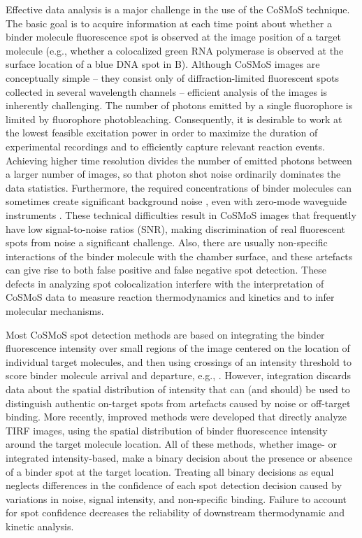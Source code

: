 Effective data analysis is a major challenge in the use of the CoSMoS technique. The basic goal is to acquire information at each time point about whether a binder molecule fluorescence spot is observed at the image position of a target molecule (e.g., whether a colocalized green RNA polymerase is observed at the surface location of a blue DNA spot in B). Although CoSMoS images are conceptually simple -- they consist only of diffraction-limited fluorescent spots collected in several wavelength channels -- efficient analysis of the images is inherently challenging. The number of photons emitted by a single fluorophore is limited by fluorophore photobleaching. Consequently, it is desirable to work at the lowest feasible excitation power in order to maximize the duration of experimental recordings and to efficiently capture relevant reaction events. Achieving higher time resolution divides the number of emitted photons between a larger number of images, so that photon shot noise ordinarily dominates the data statistics. Furthermore, the required concentrations of binder molecules can sometimes create significant background noise \citep{Peng2018-ge, Van_Oijen2011-ig}, even with zero-mode waveguide instruments \citep{Chen2014-jd}. These technical difficulties result in CoSMoS images that frequently have low signal-to-noise ratios (SNR), making discrimination of real fluorescent spots from noise a significant challenge. Also, there are usually non-specific interactions of the binder molecule with the chamber surface, and these artefacts can give rise to both false positive and false negative spot detection. These defects in analyzing spot colocalization interfere with the interpretation of CoSMoS data to measure reaction thermodynamics and kinetics and to infer molecular mechanisms.

Most CoSMoS spot detection methods are based on integrating the binder fluorescence intensity over small regions of the image centered on the location of individual target molecules, and then using crossings of an intensity threshold to score binder molecule arrival and departure, e.g., \citep{Friedman2012-if,Shcherbakova2013-bi}. However, integration discards data about the spatial distribution of intensity that can (and should) be used to distinguish authentic on-target spots from artefacts caused by noise or off-target binding.  More recently, improved methods \citep{Friedman2015-nx,Smith2019-yb} were developed that directly analyze TIRF images, using the spatial distribution of binder fluorescence intensity around the target molecule location. All of these methods, whether image- or integrated intensity-based, make a binary decision about the presence or absence of a binder spot at the target location.  Treating all binary decisions as equal neglects differences in the confidence of each spot detection decision caused by variations in noise, signal intensity, and non-specific binding.  Failure to account for spot confidence decreases the reliability of downstream thermodynamic and kinetic analysis.

